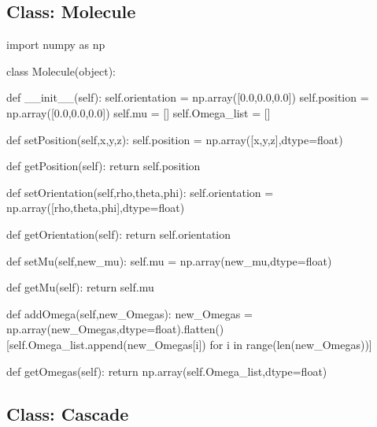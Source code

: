 \documentclass[11pt,a4paper,notitlepage]{article}
\begin{document}
\subsection{Class: Molecule}

\begin{code}
import numpy as np

class Molecule(object):
    
    def __init__(self):
        self.orientation = np.array([0.0,0.0,0.0])
        self.position = np.array([0.0,0.0,0.0])
        self.mu = []
        self.Omega_list = []
    
    def setPosition(self,x,y,z):
        self.position = np.array([x,y,z],dtype=float)
    
    def getPosition(self):
        return self.position
    
    def setOrientation(self,rho,theta,phi):
        self.orientation = np.array([rho,theta,phi],dtype=float)
    
    def getOrientation(self):
        return self.orientation
    
    def setMu(self,new_mu):
        self.mu = np.array(new_mu,dtype=float)
    
    def getMu(self):
        return self.mu
    
    def addOmega(self,new_Omegas):
        new_Omegas = np.array(new_Omegas,dtype=float).flatten()
        [self.Omega_list.append(new_Omegas[i]) for i in range(len(new_Omegas))]

    def getOmegas(self):
        return np.array(self.Omega_list,dtype=float)\end{code}

\subsection{Class: Cascade}
\end{document}
